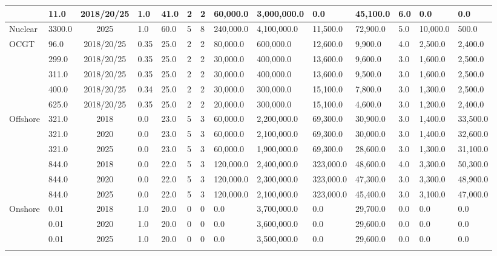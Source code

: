 \begin{table*}[]
\begin{tabularx}{\linewidth}{|p{}|l|c|l|l|l|l|l|l|l|l|l|l|l|}
& 11.0 & 2018/20/25 & 1.0 & 41.0 & 2 & 2 & 60,000.0 & 3,000,000.0 & 0.0 & 45,100.0 & 6.0 & 0.0 & 0.0 \\ \hline
Nuclear & 3300.0 & 2025 & 1.0 & 60.0 & 5 & 8 & 240,000.0 & 4,100,000.0 & 11,500.0 & 72,900.0 & 5.0 & 10,000.0 & 500.0 \\ \hline
\multirow{5}{*}{OCGT} & 96.0 & 2018/20/25 & 0.35 & 25.0 & 2 & 2 & 80,000.0 & 600,000.0 & 12,600.0 & 9,900.0 & 4.0 & 2,500.0 & 2,400.0 \\ \cline{2-14} 
& 299.0 & 2018/20/25 & 0.35 & 25.0 & 2 & 2 & 30,000.0 & 400,000.0 & 13,600.0 & 9,600.0 & 3.0 & 1,600.0 & 2,500.0 \\ \cline{2-14} 
& 311.0 & 2018/20/25 & 0.35 & 25.0 & 2 & 2 & 30,000.0 & 400,000.0 & 13,600.0 & 9,500.0 & 3.0 & 1,600.0 & 2,500.0 \\ \cline{2-14} 
& 400.0 & 2018/20/25 & 0.34 & 25.0 & 2 & 2 & 30,000.0 & 300,000.0 & 15,100.0 & 7,800.0 & 3.0 & 1,300.0 & 2,500.0 \\ \cline{2-14} 
& 625.0 & 2018/20/25 & 0.35 & 25.0 & 2 & 2 & 20,000.0 & 300,000.0 & 15,100.0 & 4,600.0 & 3.0 & 1,200.0 & 2,400.0 \\ \hline
\multirow{6}{*}{Offshore} & 321.0 & 2018 & 0.0 & 23.0 & 5 & 3 & 60,000.0 & 2,200,000.0 & 69,300.0 & 30,900.0 & 3.0 & 1,400.0 & 33,500.0 \\ \cline{2-14} 
& 321.0 & 2020 & 0.0 & 23.0 & 5 & 3 & 60,000.0 & 2,100,000.0 & 69,300.0 & 30,000.0 & 3.0 & 1,400.0 & 32,600.0 \\ \cline{2-14} 
& 321.0 & 2025 & 0.0 & 23.0 & 5 & 3 & 60,000.0 & 1,900,000.0 & 69,300.0 & 28,600.0 & 3.0 & 1,300.0 & 31,100.0 \\ \cline{2-14} 
& 844.0 & 2018 & 0.0 & 22.0 & 5 & 3 & 120,000.0 & 2,400,000.0 & 323,000.0 & 48,600.0 & 4.0 & 3,300.0 & 50,300.0 \\ \cline{2-14} 
& 844.0 & 2020 & 0.0 & 22.0 & 5 & 3 & 120,000.0 & 2,300,000.0 & 323,000.0 & 47,300.0 & 3.0 & 3,300.0 & 48,900.0 \\ \cline{2-14} 
& 844.0 & 2025 & 0.0 & 22.0 & 5 & 3 & 120,000.0 & 2,100,000.0 & 323,000.0 & 45,400.0 & 3.0 & 3,100.0 & 47,000.0 \\ \hline
\multirow{9}{*}{Onshore} & 0.01 & 2018 & 1.0 & 20.0 & 0 & 0 & 0.0 & 3,700,000.0 & 0.0 & 29,700.0 & 0.0 & 0.0 & 0.0 \\ \cline{2-14} 
& 0.01 & 2020 & 1.0 & 20.0 & 0 & 0 & 0.0 & 3,600,000.0 & 0.0 & 29,600.0 & 0.0 & 0.0 & 0.0 \\ \cline{2-14} 
& 0.01 & 2025 & 1.0 & 20.0 & 0 & 0 & 0.0 & 3,500,000.0 & 0.0 & 29,600.0 & 0.0 & 0.0 & 0.0 \\ \cline{2-14} 

\end{tabularx}
\end{table*}
